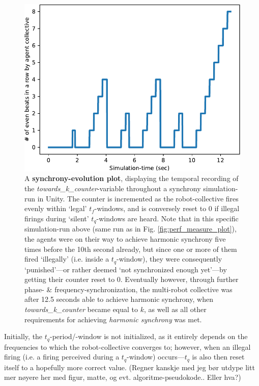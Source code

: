 		\begin{figure}[h]
			\centering
			\includegraphics[width=0.8\linewidth]{Assets/Figures/Illustrations/SynchronyEvolutionPerfMeasureIllustration.pdf}
			\caption{A \textbf{synchrony-evolution plot}, displaying the temporal recording of the \textit{towards\_k\_counter}-variable throughout a synchrony simulation-run in Unity. The counter is incremented as the robot-collective fires evenly within `legal' $t_f$-windows, and is conversely reset to 0 if illegal firings during `silent' $t_q$-windows are heard. Note that in this specific simulation-run above (same run as in Fig. \ref{fig:perf_measure_plot}), the agents were on their way to achieve harmonic synchrony five times before the 10th second already, but since one or more of them fired `illegally' (i.e. inside a $t_q$-window), they were consequently `punished'—or rather deemed `not synchronized enough yet'—by getting their counter reset to 0. Eventually however,  through further phase- \& frequency-synchronization, the multi-robot collective was after 12.5 seconds able to achieve harmonic synchrony, when \textit{towards\_k\_counter} became equal to $k$, as well as all other requirements for achieving \textit{harmonic synchrony} was met.}
			\label{fig:synch_evolution_perf_measure_ill}
		\end{figure}

		Initially, the $t_q$-period/-window is not initialized, as it entirely depends on the frequencies to which the robot-collective converges to; however, when an illegal firing (i.e. a firing perceived during a $t_q$-window) occurs—$t_q$ is also then reset itself to a hopefully more correct value. (Regner kanskje med jeg bør utdype litt mer nøyere her med figur, matte, og evt. algoritme-pseudokode.. Eller hva?)
			
	
